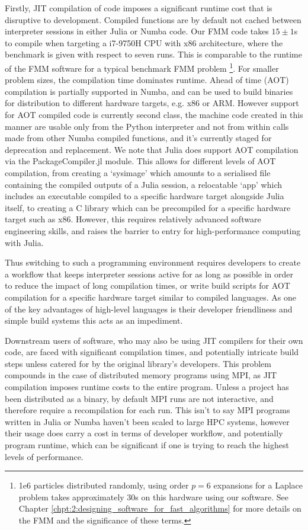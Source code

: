 Firstly, JIT compilation of code imposes a significant runtime cost that is disruptive to development. Compiled functions are by default not cached between interpreter sessions in either Julia or Numba code. Our FMM code takes $15 \pm 1$s to compile when targeting a i7-9750H CPU with x86 architecture, where the benchmark is given with respect to seven runs. This is comparable to the runtime of the FMM software for a typical benchmark FMM problem \footnote{1e6 particles distributed randomly, using order $p=6$ expansions for a Laplace problem takes approximately 30s on this hardware using our software. See Chapter \ref{chpt:2:designing_software_for_fast_algorithms} for more details on the FMM and the significance of these terms.}. For smaller problem sizes, the compilation time dominates runtime. Ahead of time (AOT) compilation is partially supported in Numba, and can be used to build binaries for distribution to different hardware targets, e.g. x86 or ARM. However support for AOT compiled code is currently second class, the machine code created in this manner are usable only from the Python interpreter and not from within calls made from other Numba compiled functions, and it's currently staged for deprecation and replacement. We note that Julia does support AOT compilation via the PackageCompiler.jl module. This allows for different levels of AOT compilation, from creating a `sysimage' which amounts to a serialised file containing the compiled outputs of a Julia session, a relocatable `app' which includes an executable compiled to a specific hardware target alongside Julia itself, to creating a C library which can be precompiled for a specific hardware target such as x86. However, this requires relatively advanced software engineering skills, and raises the barrier to entry for high-performance computing with Julia.

Thus switching to such a programming environment requires developers to create a workflow that keeps interpreter sessions active for as long as possible in order to reduce the impact of long compilation times, or write build scripts for AOT compilation for a specific hardware target similar to compiled languages. As one of the key advantages of high-level languages is their developer friendliness and simple build systems this acts as an impediment.

Downstream users of software, who may also be using JIT compilers for their own code, are faced with significant compilation times, and potentially intricate build steps unless catered for by the original library's developers. This problem compounds in the case of distributed memory programs using MPI, as JIT compilation imposes runtime costs to the entire program. Unless a project has been distributed as a binary, by default MPI runs are not interactive, and therefore require a recompilation for each run. This isn't to say MPI programs written in Julia or Numba haven't been scaled to large HPC systems, however their usage does carry a cost in terms of developer workflow, and potentially program runtime, which can be significant if one is trying to reach the highest levels of performance.


